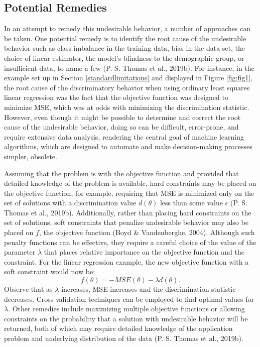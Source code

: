 \documentclass[12pt, twoside]{amherstthesis}
\begin{document}
\hypertarget{potential-remedies}{%
\subsection{Potential Remedies}\label{potential-remedies}}

In an attempt to remedy this undesirable behavior, a number of approaches can be taken. One potential remedy is to identify the root cause of the undesirable behavior such as class imbalance in the training data, bias in the data set, the choice of linear estimator, the model's blindness to the demographic group, or insufficient data, to name a few (P. S. Thomas et al., 2019b). For instance, in the example set up in Section \ref{standardlimitations} and displayed in Figure \ref{fig:fig1}, the root cause of the discriminatory behavior when using ordinary least squares linear regression was the fact that the objective function was designed to minimize MSE, which was at odds with minimizing the discrimination statistic. However, even though it might be possible to determine and correct the root cause of the undesirable behavior, doing so can be difficult, error-prone, and require extensive data analysis, rendering the central goal of machine learning algorithms, which are designed to automate and make decision-making processes simpler, obsolete.

Assuming that the problem is with the objective function and provided that detailed knowledge of the problem is available, hard constraints may be placed on the objective function, for example, requiring that MSE is minimized only on the set of solutions with a discrimination value \(d(\theta)\) less than some value \(\epsilon\) (P. S. Thomas et al., 2019b). Additionally, rather than placing hard constraints on the set of solutions, soft constraints that penalize undesirable behavior may also be placed on \(f\), the objective function (Boyd \& Vandenberghe, 2004). Although such penalty functions can be effective, they require a careful choice of the value of the parameter \(\lambda\) that places relative importance on the objective function and the constraint. For the linear regression example, the new objective function with a soft constraint would now be:
\begin{equation}
\label{ch2eq5}
f(\theta) = - MSE (\theta) - \lambda d(\theta).
\end{equation}
Observe that as \(\lambda\) increases, MSE increases and the discrimination statistic decreases. Cross-validation techniques can be employed to find optimal values for \(\lambda\). Other remedies include maximizing multiple objective functions or allowing constraints on the probability that a solution with undesirable behavior will be returned, both of which may require detailed knowledge of the application problem and underlying distribution of the data (P. S. Thomas et al., 2019b).
\end{document}
